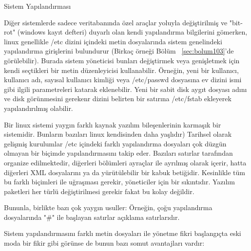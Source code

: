 \begin{section}{Sistem Yapılandırması}

Diğer sistemlerde sadece veritabanında özel araçlar yoluyla değiştirilmiş ve "bit-rot" (windows kayıt defteri) duyarlı  olan  kendi yapılandırma bilgilerini gömerken,  linux genellikle /etc dizini içindeki metin dosyalarında sistem genelindeki yapılandırma girişlerini bulundurur (Birkaç örneği Bölüm ~\ref{sec:bolum103}'de görülebilir). Burada sistem yöneticisi bunları değiştirmek veya genişletmek için kendi seçtikleri bir metin düzenleyicisi kullanabilir. Örneğin, yeni bir kullanıcı, kullanıcı adı, sayısal kullanıcı kimliği veya /etc/passwd dosyasına ev dizini ismi gibi ilgili parametreleri katarak eklenebilir. Yeni bir sabit disk aygıt dosyası adını ve disk görünmesini gerekenr dizini belirten bir satırına /etc/fstab ekleyerek yapılandırılmış olabilir.

Bir linux sistemi yaygın farklı kaynak yazılım bileşenlerinin karmaşık bir sistemidir. Bunların bazıları linux kendisinden daha yaşlıdır) Tarihsel olarak gelişmiş kurulumlar  /etc içindeki farklı yapılandırma dosyaları çok düzgün olmayan bir biçimde yapılandırmasını takip eder. Bazıları satırlar tarafından organize edilmektedir, diğerleri bölümleri ayraçlar ile ayrılmış olarak içerir, hatta diğerleri XML dosyalarını ya da yürütülebilir bir kabuk betiğidir. Kesinlikle tüm bu farklı biçimleri ile uğraşması gerekir, yöneticiler  için bir sıkıntıdır. Yazılım paketleri her türlü değiştirilmesi gerekir fakat bu kolay değildir.

Bununla, birlikte bazı çok yaygın usuller: Örneğin, çoğu yapılandırma dosyalarında "\#" ile başlayan satırlar açıklama satırlarıdır.

Sistem yapılandırmasını farklı metin dosyaları ile yönetme fikri  başlangıçta eski moda bir fikir gibi görünse de bunun bazı somut avantajları vardır:


\end{section}
